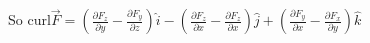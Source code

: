 \documentclass[preview]{standalone}
\begin{document}
\begin{center}
So $\text{curl} \vec{F} = (\frac{\partial F_{z}}{\partial y} - \frac{\partial F_{y}}{\partial z}) \hat{i} - (\frac{\partial F_{z}}{\partial x} - \frac{\partial F_{z}}{\partial x}) \hat{j} + (\frac{\partial F_{y}}{\partial x} - \frac{\partial F_{x}}{\partial y}) \hat{k}$
\end{center}
\end{document}
